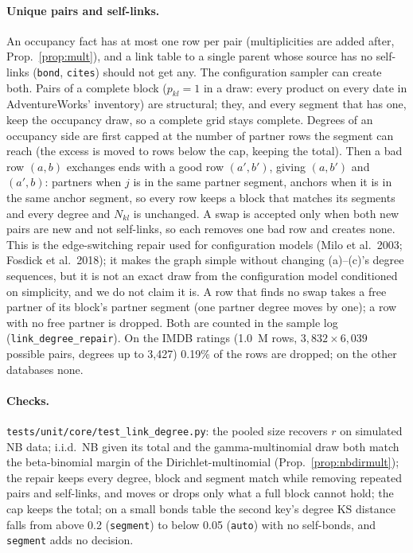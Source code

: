 \paragraph{Unique pairs and self-links.} An occupancy fact has at most one row per pair (multiplicities are added after, Prop.~\ref{prop:mult}), and a link table to a single parent whose source has no self-links (\texttt{bond}, \texttt{cites}) should not get any. The configuration sampler can create both. Pairs of a complete block ($p_{kl}=1$ in a draw: every product on every date in AdventureWorks' inventory) are structural; they, and every segment that has one, keep the occupancy draw, so a complete grid stays complete. Degrees of an occupancy side are first capped at the number of partner rows the segment can reach (the excess is moved to rows below the cap, keeping the total). Then a bad row $(a,b)$ exchanges ends with a good row $(a',b')$, giving $(a,b')$ and $(a',b)$: partners when $j$ is in the same partner segment, anchors when it is in the same anchor segment, so every row keeps a block that matches its segments and every degree and $N_{kl}$ is unchanged. A swap is accepted only when both new pairs are new and not self-links, so each removes one bad row and creates none. This is the edge-switching repair used for configuration models (Milo et al.\ 2003; Fosdick et al.\ 2018); it makes the graph simple without changing (a)--(c)'s degree sequences, but it is not an exact draw from the configuration model conditioned on simplicity, and we do not claim it is. A row that finds no swap takes a free partner of its block's partner segment (one partner degree moves by one); a row with no free partner is dropped. Both are counted in the sample log (\texttt{link\_degree\_repair}). On the IMDB ratings (1.0~M rows, $3{,}832\times6{,}039$ possible pairs, degrees up to 3{,}427) 0.19\% of the rows are dropped; on the other databases none.

\paragraph{Checks.} \texttt{tests/unit/core/test\_link\_degree.py}: the pooled size recovers $r$ on simulated NB data; i.i.d.\ NB given its total and the gamma-multinomial draw both match the beta-binomial margin of the Dirichlet-multinomial (Prop.~\ref{prop:nbdirmult}); the repair keeps every degree, block and segment match while removing repeated pairs and self-links, and moves or drops only what a full block cannot hold; the cap keeps the total; on a small bonds table the second key's degree KS distance falls from above 0.2 (\texttt{segment}) to below 0.05 (\texttt{auto}) with no self-bonds, and \texttt{segment} adds no decision.
